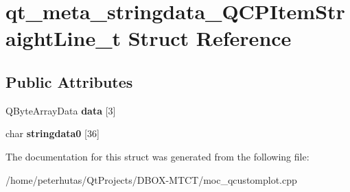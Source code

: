\hypertarget{structqt__meta__stringdata___q_c_p_item_straight_line__t}{}\section{qt\+\_\+meta\+\_\+stringdata\+\_\+\+Q\+C\+P\+Item\+Straight\+Line\+\_\+t Struct Reference}
\label{structqt__meta__stringdata___q_c_p_item_straight_line__t}
\subsection*{Public Attributes}
\begin{DoxyCompactItemize}
\item 
\mbox{\label{structqt__meta__stringdata___q_c_p_item_straight_line__t_a1b24e360df4ab7c0917a94969f909ba0}} 
Q\+Byte\+Array\+Data {\bfseries data} \mbox{[}3\mbox{]}
\item 
\mbox{\label{structqt__meta__stringdata___q_c_p_item_straight_line__t_a0e2c6dce44cbc1e13041b33cd138f25d}} 
char {\bfseries stringdata0} \mbox{[}36\mbox{]}
\end{DoxyCompactItemize}


The documentation for this struct was generated from the following file\+:\begin{DoxyCompactItemize}
\item 
/home/peterhutas/\+Qt\+Projects/\+D\+B\+O\+X-\/\+M\+T\+C\+T/moc\+\_\+qcustomplot.\+cpp\end{DoxyCompactItemize}
